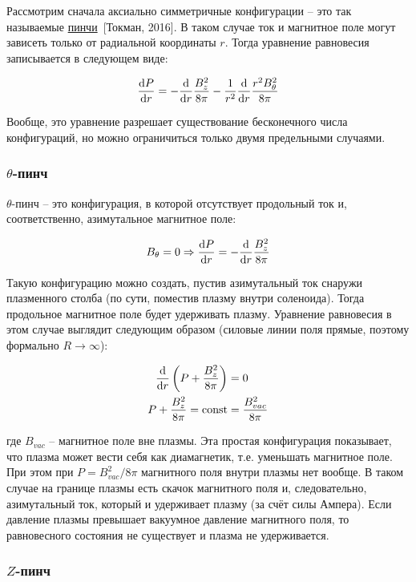 \documentclass[10pt, a4paper]{article}
\newcommand{\Tokman}{~[Токман, 2016]}
\begin{document}
Рассмотрим сначала аксиально симметричные конфигурации -- это так называемые \uline{пинчи}\Tokman. В таком случае ток и магнитное поле могут зависеть только от радиальной координаты $r$. Тогда уравнение равновесия записывается в следующем виде:

\begin{equation*}
	\dv{P}{r} = -\dv{}{r}\frac{B_z^2}{8\pi} - \frac{1}{r^2}\dv{}{r}\frac{r^2 B_\theta^2}{8\pi}
\end{equation*}

Вообще, это уравнение разрешает существование бесконечного числа конфигураций, но можно ограничиться только двумя предельными случаями.

\subsubsection{$\theta$-пинч}

$\theta$-пинч -- это конфигурация, в которой отсутствует продольный ток и, соответственно, азимутальное магнитное поле:

\begin{equation*}
	B_\theta = 0 \Rightarrow \dv{P}{r} = -\dv{}{r}\frac{B_z^2}{8\pi}
\end{equation*}

Такую конфигурацию можно создать, пустив азимутальный ток снаружи плазменного столба (по сути, поместив плазму внутри соленоида). Тогда продольное магнитное поле будет удерживать плазму. Уравнение равновесия в этом случае выглядит следующим образом (силовые линии поля прямые, поэтому формально $R\rightarrow\infty$):

\begin{align*}
	\dv{}{r}\left( P + \frac{B_z^2}{8\pi} \right) &= 0 \\
	P + \frac{B_z^2}{8\pi} = \text{const} &= \frac{B_{vac}^2}{8\pi}
\end{align*}

где $B_{vac}$ -- магнитное поле вне плазмы. Эта простая конфигурация показывает, что плазма может вести себя как диамагнетик, т.е. уменьшать магнитное поле. При этом при $P = B_{vac}^2/8\pi$ магнитного поля внутри плазмы нет вообще. В таком случае на границе плазмы есть скачок магнитного поля и, следовательно, азимутальный ток, который и удерживает плазму (за счёт силы Ампера). Если давление плазмы превышает вакуумное давление магнитного поля, то равновесного состояния не существует и плазма не удерживается.

\subsubsection{$Z$-пинч}
\end{document}
